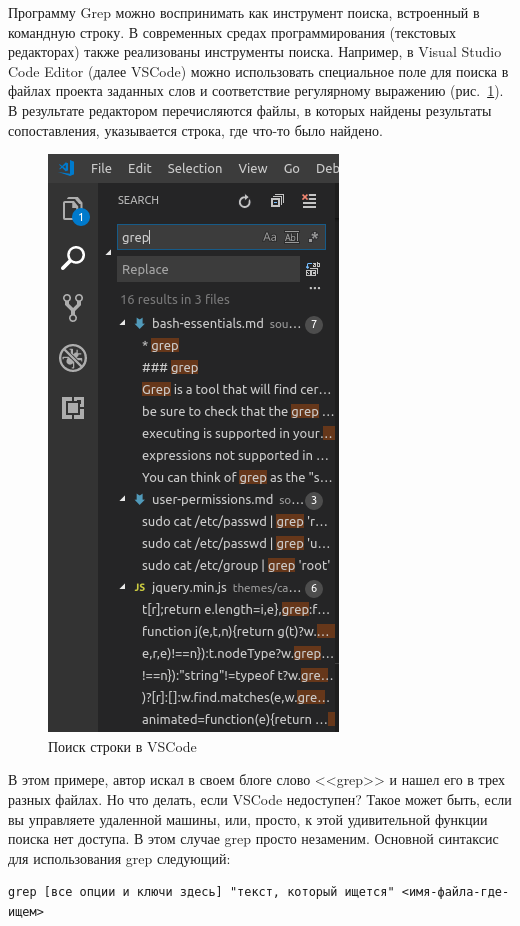 \documentclass[a4paper,12pt,final,openany]{extbook}
\begin{document}
Программу Grep можно воспринимать как инструмент поиска, встроенный в командную
строку. В современных средах программирования (текстовых редакторах)
также реализованы инструменты поиска. Например, в Visual Studio Code Editor (далее VSCode)
можно использовать специальное поле для поиска в файлах проекта
заданных слов и соответствие регулярному выражению (рис.~\ref{fig:vscodesearch}). В результате редактором перечисляются файлы, в которых найдены
результаты сопоставления, указывается строка, где что-то было найдено.
\begin{figure}[tbh]\centering

\includegraphics[width=0.5\linewidth]{blog/2019/bash-essentials/vscode-search.png}

\caption{Поиск строки в VSCode}
\label{fig:vscodesearch}
\end{figure}
В этом примере, автор искал в своем блоге слово <<grep>> и нашел его в трех разных файлах. Но что делать, если VSCode недоступен? Такое может
быть, если вы управляете удаленной машины, или, просто, к этой
удивительной функции поиска нет доступа. В этом случае grep просто
незаменим. Основной синтаксис для использования grep следующий:

\begin{verbatim}
grep [все опции и ключи здесь] "текст, который ищется" <имя-файла-где-ищем>
\end{verbatim}
\end{document}
